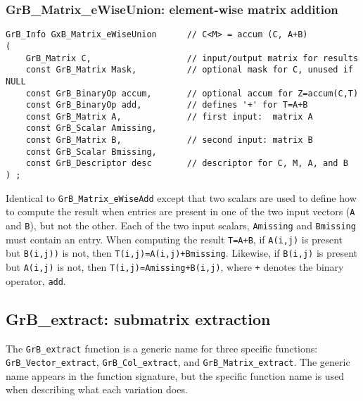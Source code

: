 \documentclass[12pt]{article}
\begin{document}
\newpage
\subsubsection{{\sf GrB\_Matrix\_eWiseUnion:} element-wise matrix addition}
\label{eWiseUnion_matrix}

\begin{mdframed}[userdefinedwidth=6in]
{\footnotesize
\begin{verbatim}
GrB_Info GxB_Matrix_eWiseUnion      // C<M> = accum (C, A+B)
(
    GrB_Matrix C,                   // input/output matrix for results
    const GrB_Matrix Mask,          // optional mask for C, unused if NULL
    const GrB_BinaryOp accum,       // optional accum for Z=accum(C,T)
    const GrB_BinaryOp add,         // defines '+' for T=A+B
    const GrB_Matrix A,             // first input:  matrix A
    const GrB_Scalar Amissing,
    const GrB_Matrix B,             // second input: matrix B
    const GrB_Scalar Bmissing,
    const GrB_Descriptor desc       // descriptor for C, M, A, and B
) ;
\end{verbatim} } \end{mdframed}

Identical to \verb'GrB_Matrix_eWiseAdd' except that two scalars are used
to define how to compute the result when entries are present in one of
the two input vectors (\verb'A' and \verb'B'), but not the other.
Each of the two input scalars, \verb'Amissing' and \verb'Bmissing'
must contain an entry.
When computing the result \verb'T=A+B',
if \verb'A(i,j)' is present but \verb'B(i,j))' is not, then \verb'T(i,j)=A(i,j)+Bmissing'.
Likewise,
if \verb'B(i,j)' is present but \verb'A(i,j)' is not, then \verb'T(i,j)=Amissing+B(i,j)',
where \verb'+' denotes the binary operator, \verb'add'.

\newpage
\subsection{{\sf GrB\_extract:} submatrix extraction } %
\label{extract}

The \verb'GrB_extract' function is a generic name for three specific functions:
\verb'GrB_Vector_extract', \verb'GrB_Col_extract', and
\verb'GrB_Matrix_extract'.  The generic name appears in the function signature,
but the specific function name is used when describing what each variation
does.
\end{document}
